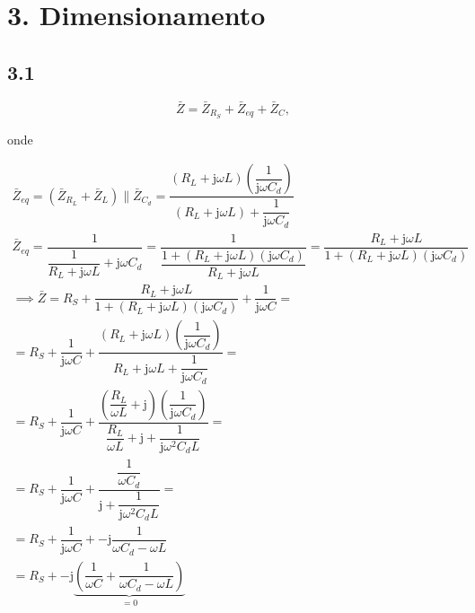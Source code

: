 \documentclass[a4paper, titlepage, portuguese]{article}
\begin{document}
	\section{3. Dimensionamento}
	\subsection{3.1}
	
		
	
		\begin{equation}
			\bar{Z} = \bar{Z}_{R_S} + \bar{Z}_{eq} + \bar{Z}_C,
		\end{equation}
		
		onde
		
		\begin{gather*}
			\bar{Z}_{eq} = (\bar{Z}_{R_L} + \bar{Z}_{L}) \parallel \bar{Z}_{C_d} = \dfrac{\left(R_L + \mathrm{j} \omega L\right)\left(\dfrac{1}{\mathrm{j} \omega C_d}\right)}{(R_L + \mathrm{j} \omega L) + \dfrac{1}{\mathrm{j} \omega C_d}} \\
			\bar{Z}_{eq} = \dfrac{1}{\dfrac{1}{R_L + \mathrm{j} \omega L} + \mathrm{j} \omega C_d} =
			\dfrac{1}{\dfrac{1 + (R_L + \mathrm{j} \omega L)(\mathrm{j} \omega C_d)}{R_L + \mathrm{j} \omega L}} =
			\dfrac{R_L + \mathrm{j} \omega L}{1 + (R_L + \mathrm{j} \omega L)(\mathrm{j} \omega C_d)} \\
			\implies \bar{Z} = R_S + \dfrac{R_L + \mathrm{j} \omega L}{1 + (R_L + \mathrm{j} \omega L)(\mathrm{j} \omega C_d)} + \dfrac{1}{\mathrm{j} \omega C} = \\
			= R_S + \dfrac{1}{\mathrm{j} \omega C} + \dfrac{\left(R_L + \mathrm{j} \omega L\right)\left(\dfrac{1}{\mathrm{j} \omega C_d}\right)}{R_L + \mathrm{j} \omega L + \dfrac{1}{\mathrm{j} \omega C_d}} = \\
			= R_S + \dfrac{1}{\mathrm{j} \omega C} + \dfrac{\left(\dfrac{R_L}{\omega L} + \mathrm{j}\right)\left(\dfrac{1}{\mathrm{j} \omega C_d}\right)}{\dfrac{R_L}{\omega L} + \mathrm{j} + \dfrac{1}{\mathrm{j} \omega^2 C_d L}} = \\
			= R_S + \dfrac{1}{\mathrm{j} \omega C} + \dfrac{\dfrac{1}{\omega C_d}}{\mathrm{j} + \dfrac{1}{\mathrm{j} \omega^2 C_d L}} = \\
			= R_S + \dfrac{1}{\mathrm{j} \omega C} + -\mathrm{j}\dfrac{1}{\omega C_d - \omega L} \\
			= R_S + -\mathrm{j}\underbrace{\left(\dfrac{1}{\omega C} + \dfrac{1}{\omega C_d - \omega L}\right)}_{= 0}
		\end{gather*}
		
\end{document}
